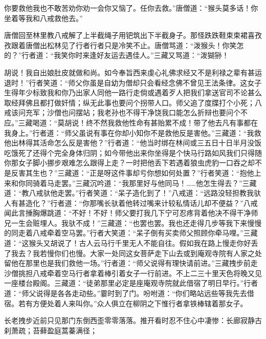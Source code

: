 \documentclass[12pt,UTF8]{ctexbook}
\begin{document}
{	你要救他我也不敢苦劝你劝一会你又恼了。任你去救。”唐僧道：“猴头莫多话！你坐着等我和八戒救他去。”
	
	唐僧回至林里教八戒解了上半截绳子用钯筑出下半截身子。那怪跌跌鞋束束裙喜孜孜跟着唐僧出松林见了行者行者只是冷笑不止。唐僧骂道：“泼猴头！你笑怎的？”行者道：“我笑你时来逢好友运去遇佳人。”三藏又骂道：“泼猢狲！
	
	胡说！我自出娘肚皮就做和尚。如今奉旨西来虔心礼佛求经又不是利禄之辈有甚运退时！”行者笑道：“师父你虽是自幼为僧却只会看经念佛不曾见王法条律。这女子生得年少标致我和你乃出家人同他一路行走倘或遇着歹人把我们拿送官司不论甚么取经拜佛且都打做奸情；纵无此事也要问个拐带人口。师父追了度牒打个小死；八戒该问充军；沙僧也问摆站；我老孙也不得干净饶我口能怎么折辩也要问个不应。”三藏喝道：“莫胡说！终不然我救他性命有甚贻累不成！带了他去凡有事都在我身上。”行者道：“师父虽说有事在你却小知你不是救他反是害他。”三藏道：“我救他出林得其活命怎么反是害他？”行者道：“他当时绑在林间或三五日十日半月没饭吃饿死了还得个完全身体归阴；如今带他出来你坐得是个快马行路如风我们只得随你那女子脚小挪步艰难怎么跟得上走？一时把他丢下若遇着狼虫虎豹一口吞之却不是反害其生也？”三藏道：“正是呀这件事却亏你想如何处置？”行者笑道：“抱他上来和你同骑着马走罢。”三藏沉吟道：“我那里好与他同马！……他怎生得去？”三藏道：“教八戒驮他走罢。”行者笑道：“呆子造化到了！”八戒道：“远路没轻担教我驮人有甚造化？”行者道：“你那嘴长驮着他转过嘴来计较私情话儿却不便益？”八戒闻此言捶胸爆跳道：“不好！不好！师父要打我几下宁可忍疼背着他决不得干净师兄一生会赃埋人。我驮不成！”三藏道：“也罢也罢。我也还走得几步等我下来慢慢的同走着八戒牵着空马罢。”行者大笑道：“呆子倒有买卖师父照顾你牵马哩。”三藏道：“这猴头又胡说了！古人云马行千里无人不能自往。假如我在路上慢走你好丢了我去？我若慢你们也慢。大家一处同这女菩萨走下山去或到庵观寺院有人家之处留他在那里也是我们救他一场。”行者道：“师父说得有理快请前进。”三藏拽步前走沙僧挑担八戒牵着空马行者拿着棒引着女子一行前进。不上二三十里天色将晚又见一座楼台殿阁。三藏道：“徒弟那里必定是座庵观寺院就此借宿了明日早行。”行者道：“师父说得是各各走动些。”霎时到了门。吩咐道：“你们略站远些等我先去借宿。若有方便处着人来叫你。”众人俱立在柳阴之下惟行者拿铁棒辖着那女子。
	
	长老拽步近前只见那门东倒西歪零零落落。推开看时忍不住心中凄惨：长廊寂静古刹萧疏；苔藓盈庭蒿蓁满径；
	
}
\end{document}
